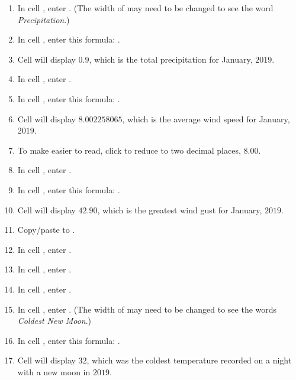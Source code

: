 \begin{enumerate}[resume]
	\item In cell , enter .  (The width of  may need to be changed to see the word \textit{Precipitation}.)
	\item In cell , enter this formula: .
	\item Cell  will display $ 0.9 $, which is the total precipitation for January, $ 2019 $.

	\item In cell , enter .
	\item In cell , enter this formula: .
	\item Cell  will display $ 8.002258065 $, which is the average wind speed for January, $ 2019 $.
	\item To make  easier to read, click  to reduce  to two decimal places, $ 8.00 $.

	\item In cell , enter .
	\item In cell , enter this formula: .
	\item Cell  will display $ 42.90 $, which is the greatest wind gust for January, $ 2019 $.

	\item Copy/paste  to .
	\item In cell , enter .
	\item In cell , enter .
	\item In cell , enter .
	\item In cell , enter . (The width of  may need to be changed to see the words \textit{Coldest New Moon}.)
	\item In cell , enter this formula: .
	\item Cell  will display $ 32 $, which was the coldest temperature recorded on a night with a new moon in $ 2019 $.


\end{enumerate}
